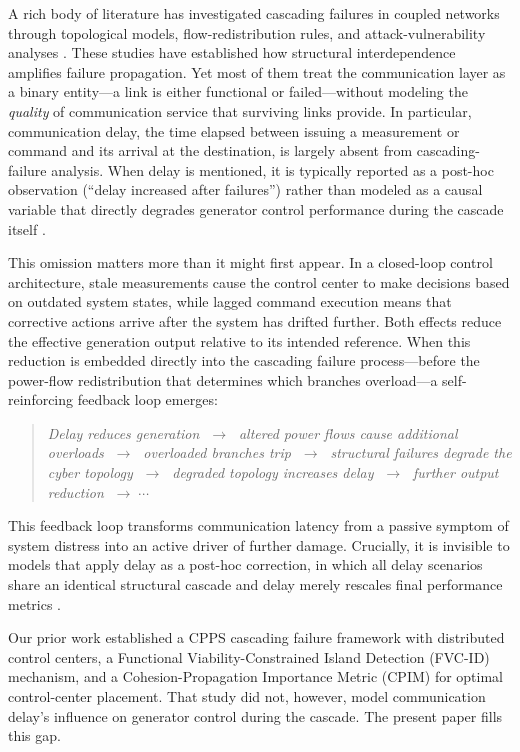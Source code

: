 \documentclass[a4paper,fleqn]{cas-dc}
\begin{document}
A rich body of literature has investigated cascading failures in coupled
networks through topological models, flow-redistribution rules, and
attack-vulnerability analyses
\citep{Motter2002,Dobson2007,Brummitt2012}.  These studies have
established how structural interdependence amplifies failure propagation.
Yet most of them treat the communication layer as a binary entity---a
link is either functional or failed---without modeling the \emph{quality}
of communication service that surviving links provide.  In particular,
communication delay, the time elapsed between issuing a measurement or
command and its arrival at the destination, is largely absent from
cascading-failure analysis.  When delay is mentioned, it is typically
reported as a post-hoc observation (``delay increased after failures'')
rather than modeled as a causal variable that directly degrades generator
control performance during the cascade itself
\citep{Milano2012,Huang2015}.

This omission matters more than it might first appear.  In a closed-loop
control architecture, stale measurements cause the control center to
make decisions based on outdated system states, while lagged command
execution means that corrective actions arrive after the system has
drifted further.  Both effects reduce the effective generation output
relative to its intended reference.  When this reduction is embedded
directly into the cascading failure process---before the power-flow
redistribution that determines which branches overload---a
self-reinforcing feedback loop emerges:
\begin{quote}
\emph{Delay reduces generation $\;\to\;$ altered power flows cause
additional overloads $\;\to\;$ overloaded branches trip $\;\to\;$
structural failures degrade the cyber topology $\;\to\;$ degraded
topology increases delay $\;\to\;$ further output reduction
$\;\to\;\cdots$}
\end{quote}
This feedback loop transforms communication latency from a passive
symptom of system distress into an active driver of further damage.
Crucially, it is invisible to models that apply delay as a post-hoc
correction, in which all delay scenarios share an identical structural
cascade and delay merely rescales final performance metrics
\citep{LaiCPPS2019}.

Our prior work \citep{ChenTu2026} established a CPPS cascading failure
framework with distributed control centers, a Functional
Viability-Constrained Island Detection (FVC-ID) mechanism, and a
Cohesion-Propagation Importance Metric (CPIM) for optimal control-center
placement.  That study did not, however, model communication delay's
influence on generator control during the cascade.  The present paper
fills this gap.
\end{document}
